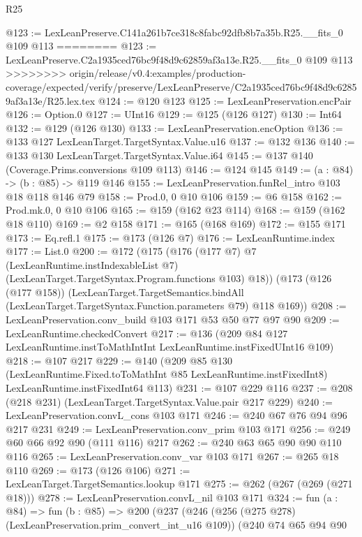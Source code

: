 \begin{lexlean}{R25}
\begin{coremodule}
{{{{{@123 := LexLeanPreserve.C141a261b7ce318c8fabc92dfb8b7a35b.R25.__fits_0 @109 @113
========
@123 := LexLeanPreserve.C2a1935ced76bc9f48d9c62859af3a13e.R25.__fits_0 @109 @113
>>>>>>>> origin/release/v0.4:examples/production-coverage/expected/verify/preserve/LexLeanPreserve/C2a1935ced76bc9f48d9c62859af3a13e/R25.lex.tex
@124 := @120 @123
@125 := LexLeanPreservation.encPair
@126 := Option.{0}
@127 := UInt16
@129 := @125 (@126 @127)
@130 := Int64
@132 := @129 (@126 @130)
@133 := LexLeanPreservation.encOption
@136 := @133 @127 LexLeanTarget.TargetSyntax.Value.u16
@137 := @132 @136
@140 := @133 @130 LexLeanTarget.TargetSyntax.Value.i64
@145 := @137 @140 (Coverage.Prims.conversions @109 @113)
@146 := @124 @145
@149 := (a : @84) -> (b : @85) -> @119 @146
@155 := LexLeanPreservation.funRel_intro @103 @18 @118 @146 @79
@158 := Prod.{0, 0} @10 @106
@159 := @6 @158
@162 := Prod.mk.{0, 0} @10 @106
@165 := @159 (@162 @23 @114)
@168 := @159 (@162 @18 @110)
@169 := @2 @158
@171 := @165 (@168 @169)
@172 := @155 @171
@173 := Eq.refl.{1}
@175 := @173 (@126 @7)
@176 := LexLeanRuntime.index
@177 := List.{0}
@200 := @172
    (@175
      (@176
        (@177 @7)
        @7
        (LexLeanRuntime.instIndexableList @7)
        (LexLeanTarget.TargetSyntax.Program.functions @103)
        @18))
    (@173
      (@126 (@177 @158))
      (LexLeanTarget.TargetSemantics.bindAll
        (LexLeanTarget.TargetSyntax.Function.parameters @79)
        @118
        @169))
@208 := LexLeanPreservation.conv_build @103 @171 @53 @50 @77 @97 @90
@209 := LexLeanRuntime.checkedConvert
@217 := @136 (@209 @84 @127 LexLeanRuntime.instToMathIntInt LexLeanRuntime.instFixedUInt16 @109)
@218 := @107 @217
@229 := @140
    (@209
      @85
      @130
      (LexLeanRuntime.Fixed.toToMathInt @85 LexLeanRuntime.instFixedInt8)
      LexLeanRuntime.instFixedInt64
      @113)
@231 := @107 @229 @116
@237 := @208 (@218 @231) (LexLeanTarget.TargetSyntax.Value.pair @217 @229)
@240 := LexLeanPreservation.convL_cons @103 @171
@246 := @240 @67 @76 @94 @96 @217 @231
@249 := LexLeanPreservation.conv_prim @103 @171
@256 := @249 @60 @66 @92 @90 (@111 @116) @217
@262 := @240 @63 @65 @90 @90 @110 @116
@265 := LexLeanPreservation.conv_var @103 @171
@267 := @265 @18 @110
@269 := @173 (@126 @106)
@271 := LexLeanTarget.TargetSemantics.lookup @171
@275 := @262 (@267 (@269 (@271 @18)))
@278 := LexLeanPreservation.convL_nil @103 @171
@324 := fun (a : @84) =>
  fun (b : @85) =>
  @200
    (@237
      (@246
        (@256 (@275 @278) (LexLeanPreservation.prim_convert_int_u16 @109))
        (@240
          @74
          @65
          @94
          @90
}}}}}
\end{coremodule}
\end{lexlean}

